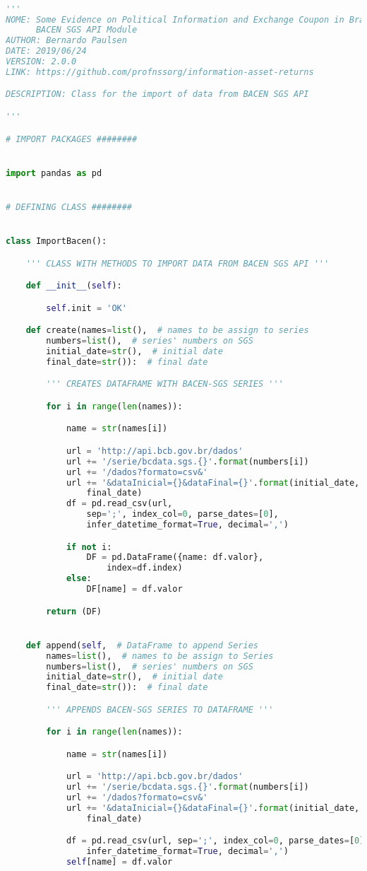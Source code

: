 \begin{lstlisting}[language=Python]

'''
NOME: Some Evidence on Political Information and Exchange Coupon in Brazil -
      BACEN SGS API Module
AUTHOR: Bernardo Paulsen
DATE: 2019/06/24
VERSION: 2.0.0
LINK: https://github.com/profnssorg/information-asset-returns

DESCRIPTION: Class for the import of data from BACEN SGS API

'''

# IMPORT PACKAGES ########


import pandas as pd


# DEFINING CLASS ########


class ImportBacen():

    ''' CLASS WITH METHODS TO IMPORT DATA FROM BACEN SGS API '''

    def __init__(self):

        self.init = 'OK'

    def create(names=list(),  # names to be assign to series
        numbers=list(),  # series' numbers on SGS
        initial_date=str(),  # initial date
        final_date=str()):  # final date

        ''' CREATES DATAFRAME WITH BACEN-SGS SERIES '''

        for i in range(len(names)):

            name = str(names[i])

            url = 'http://api.bcb.gov.br/dados'
            url += '/serie/bcdata.sgs.{}'.format(numbers[i])
            url += '/dados?formato=csv&'
            url += '&dataInicial={}&dataFinal={}'.format(initial_date,
                final_date)
            df = pd.read_csv(url,
                sep=';', index_col=0, parse_dates=[0],
                infer_datetime_format=True, decimal=',')

            if not i:
                DF = pd.DataFrame({name: df.valor},
                    index=df.index)
            else:
                DF[name] = df.valor

        return (DF)


    def append(self,  # DataFrame to append Series
        names=list(),  # names to be assign to Series
        numbers=list(),  # series' numbers on SGS
        initial_date=str(),  # initial date
        final_date=str()):  # final date

        ''' APPENDS BACEN-SGS SERIES TO DATAFRAME '''

        for i in range(len(names)):

            name = str(names[i])

            url = 'http://api.bcb.gov.br/dados'
            url += '/serie/bcdata.sgs.{}'.format(numbers[i])
            url += '/dados?formato=csv&'
            url += '&dataInicial={}&dataFinal={}'.format(initial_date,
                final_date)

            df = pd.read_csv(url, sep=';', index_col=0, parse_dates=[0],
                infer_datetime_format=True, decimal=',')
            self[name] = df.valor



\end{lstlisting}